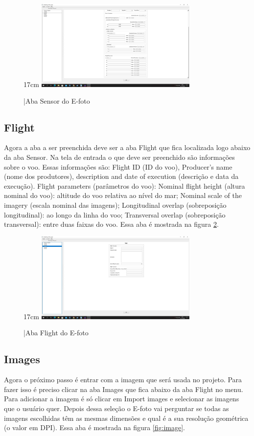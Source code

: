 \begin{figure}[!ht]{17cm}
	\centering
	\includegraphics[width=8cm]{Figuras/sensor2.jpg}
	\caption{|Aba Sensor do E-foto} \label{fig:sensor2}
\end{figure}

\subsection{Flight}
Agora a aba a ser preenchida deve ser a aba Flight que fica localizada logo abaixo da aba Sensor. Na tela de entrada o que deve ser preenchido são informações sobre o voo. Essas informações são: Flight ID (ID do voo), Producer’s name (nome dos produtores), description and date of execution (descrição e data da execução). Flight parameters (parâmetros do voo): Nominal flight height (altura nominal do voo): altitude do voo relativa ao nível do mar; Nominal scale of the imagery (escala nominal das imagens); Longitudinal overlap (sobreposição longitudinal): ao longo da linha do voo; Transversal overlap (sobreposição transversal): entre duas faixas do voo. Essa aba é mostrada na figura \ref{fig:flight}.

\begin{figure}[!ht]{17cm}
	\centering
	\includegraphics[width=8cm]{Figuras/flight.jpg}
	\caption{|Aba Flight do E-foto} \label{fig:flight}
\end{figure}

\subsection{Images}
Agora o próximo passo é entrar com a imagem que será usada no projeto. Para fazer isso é preciso clicar na aba Images que fica abaixo da aba Flight no menu. Para adicionar a imagem é só clicar em Import images e selecionar as imagens que o usuário quer. Depois dessa seleção o E-foto vai perguntar se todas as imagens escolhidas têm as mesmas dimensões e qual é a sua resolução geométrica (o valor em DPI). Essa aba é mostrada na figura \ref{fig:image}. 

